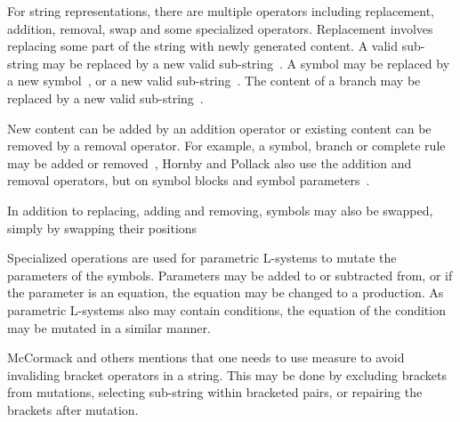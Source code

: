 For string representations, there are multiple operators including replacement, addition, removal, swap and some specialized operators.
Replacement involves replacing some part of the string with newly generated content.
A valid sub-string may be replaced by a new valid sub-string~\cite{1998Mock, 2009Corchado}.
A symbol may be replaced by a new symbol~\cite{2001Hornby, 2002Ebner, 2003Ebner, 2009Corchado, 2013Ding}, or a new valid sub-string~\cite{1998Ochoa}.
The content of a branch may be replaced by a new valid sub-string~\cite{1998Ochoa}.

New content can be added by an addition operator or existing content can be removed by a removal operator.
For example, a symbol, branch or complete rule may be added or removed~\cite{2002Ebner, 2003Ebner},
Hornby and Pollack also use the addition and removal operators, but on symbol blocks and symbol parameters~\cite{2001Hornby}.

In addition to replacing, adding and removing, symbols may also be swapped, simply by swapping their positions~\cite{2002Ebner, 2003Ebner}

Specialized operations are used for parametric L-systems to mutate the parameters of the symbols.
Parameters may be added to or subtracted from, or if the parameter is an equation, the equation may be changed to a production.
As parametric L-systems also may contain conditions, the equation of the condition may be mutated in a similar manner.~\cite{2001Hornby}

McCormack and others mentions that one needs to use measure to avoid invaliding bracket operators in a string.
This may be done by excluding brackets from mutations, selecting sub-string within bracketed pairs, or repairing the brackets after mutation.~\cite{2004McCormack}

